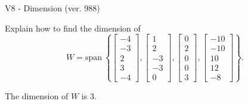 \begin{exercise}
  \begin{exerciseTitle}V8 - Dimension (ver. 988)\end{exerciseTitle}
  \begin{exerciseStatement}
    Explain how to find the dimension of 
\[W=\mathrm{span}\ \left\{\left[\begin{array}{r}
-4 \\
-3 \\
2 \\
3 \\
-4
\end{array}\right] , \left[\begin{array}{r}
1 \\
2 \\
-3 \\
-3 \\
0
\end{array}\right] , \left[\begin{array}{r}
0 \\
2 \\
0 \\
0 \\
3
\end{array}\right] , \left[\begin{array}{r}
-10 \\
-10 \\
10 \\
12 \\
-8
\end{array}\right]\right\}.\]



  \end{exerciseStatement}
  \begin{exerciseAnswer}
   The dimension of \(W\) is  \(3\).
  


  \end{exerciseAnswer}
\end{exercise}